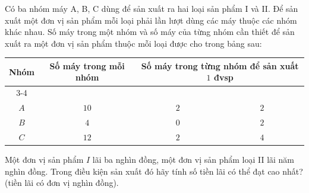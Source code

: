 \begin{ex}%
	Có ba nhóm máy A, B, C dùng để sản xuất ra hai loại sản phẩm I và II. Để sản xuất một đơn vị sản phẩm mỗi loại phải lần lượt dùng các máy thuộc các nhóm khác nhau. Số máy trong một nhóm và số máy của từng nhóm cần thiết để sản xuất ra một đơn vị sản phẩm thuộc mỗi loại được cho trong bảng sau:
	\begin{center}
		\renewcommand{\arraystretch}{1.5}
		\begin{tabular}{|c|c|c|c|}
			\hline
			\multirow{2}{*}{Nhóm} & \multirow{2}{*}{Số máy trong mỗi nhóm} & \multicolumn{2}{c|}{Số máy trong từng nhóm để sản xuất $1$ đvsp} \\
			\cline{3-4}
			& & \makebox[3.5cm]{Loại $I$} & \makebox[3.5cm]{Loại $II$} \\
			\hline
			$A$ & $10$ & $2$ & $2$ \\
			\hline
			$B$ & $4$ & $0$ & $2$ \\
			\hline
			$C$ & $12$ & $2$ & $4$ \\
			\hline
		\end{tabular}
	\end{center}	
	Một đơn vị sản phẩm $I$ lãi ba nghìn đồng, một đơn vị sản phẩm loại II lãi năm nghìn đồng. Trong điều kiện sản xuất đó hãy tính số tiền lãi có thể đạt cao nhất? (tiền lãi có đơn vị nghìn đồng).
\end{ex}
